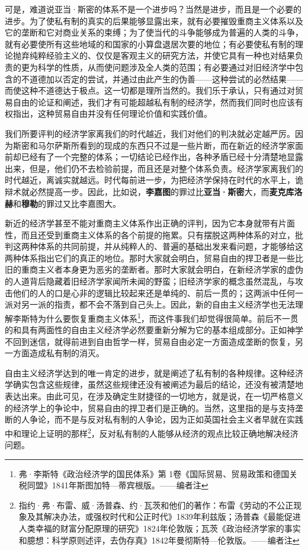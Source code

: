 \documentclass[a4paper,twoside,12pt]{ctexart}
\begin{document}
可是，难道说亚当·斯密的体系不是一个进步吗？当然是进步，而且是一个必要的进步。为了使私有制的真实的后果能够显露出来，就有必要摧毁重商主义体系以及它的垄断和它对商业关系的束缚；为了使当代的斗争能够成为普遍的人类的斗争，就有必要使所有这些地域的和国家的小算盘退居次要的地位；有必要使私有制的理论抛弃纯粹经验主义的、仅仅是客观主义的研究方法，并使它具有一种也对结果负责的更为科学的性质，从而使问题涉及全人类的范围；有必要通过对旧经济学中包含的不道德加以否定的尝试，并通过由此产生的伪善——这种尝试的必然结果——而使这种不道德达于极点。这一切都是理所当然的。我们乐于承认，只有通过对贸易自由的论证和阐述，我们才有可能超越私有制的经济学，然而我们同时也应该有权指出，这种贸易自由并没有任何理论价值和实践价值。

我们所要评判的经济学家离我们的时代越近，我们对他们的判决就必定越严厉。因为斯密和马尔萨斯所看到的现成的东西只不过是一些片断，而在新近的经济学家面前却已经有了一个完整的体系；一切结论已经作出，各种矛盾已经十分清楚地显露出来，但是，他们仍不去检验前提，而且还是对整个体系负责。经济学家离我们的时代越近，离诚实就越远。时代每前进一步，为把经济学保持在时代的水平上，诡辩术就必然提高一步。因此，比如说，\textbf{李嘉图}的罪过比\textbf{亚当·斯密}大，而\textbf{麦克库洛赫}和\textbf{穆勒}的罪过又比李嘉图大。

新近的经济学甚至不能对重商主义体系作出正确的评判，因为它本身就带有片面性，而且还受到重商主义体系的各个前提的拖累。只有摆脱这两种体系的对立，批判这两种体系的共同前提，并从纯粹人的、普遍的基础出发来看问题，才能够给这两种体系指出它们的真正的地位。那时大家就会明白，贸易自由的捍卫者是一些比旧的重商主义者本身更为恶劣的垄断者。那时大家就会明白，在新经济学家的虚伪的人道背后隐藏着旧经济学家闻所未闻的野蛮；旧经济学家的概念虽然混乱，与攻击他们的人的口是心非的逻辑比较起来还是单纯的、前后一贯的；这两派中任何一派对另一派的指责，都不会不落到自己头上。因此，新的自由主义经济学也无法理解李斯特为什么要恢复重商主义体系\footnote{弗·李斯特《政治经济学的国民体系》第 1卷《国际贸易、贸易政策和德国关税同盟》1841年斯图加特—蒂宾根版。——编者注}，而这件事我们却觉得很简单。前后不一贯的和具有两面性的自由主义经济学必然要重新分解为它的基本组成部分。正如神学不回到迷信，就得前进到自由哲学一样，贸易自由必定一方面造成垄断的恢复，另一方面造成私有制的消灭。

自由主义经济学达到的唯一肯定的进步，就是阐述了私有制的各种规律。这种经济学确实包含这些规律，虽然这些规律还没有被阐述为最后的结论，还没有被清楚地表达出来。由此可见，在涉及确定生财捷径的一切地方，就是说，在一切严格意义的经济学上的争论中，贸易自由的捍卫者们是正确的。当然，这里指的是与支持垄断的人争论，而不是与反对私有制的人争论，因为正如英国社会主义者早就在实践中和理论上证明的那样\footnote{指约·弗·布雷、威·汤普森、约·瓦茨和他们的著作：布雷《劳动的不公正现象及其解决办法，或强权时代和公正时代》1839年利兹版；汤普森《最能促进人类幸福的财富分配原理的研究》1824年伦敦版；瓦茨《政治经济学家的事实和臆想：科学原则述评，去伪存真》1842年曼彻斯特—伦敦版。——编者注}，反对私有制的人能够从经济的观点比较正确地解决经济问题。
\end{document}
